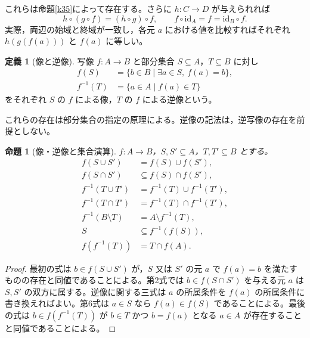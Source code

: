 \documentclass[a5paper,10pt,dvipdfmx]{jsarticle}
\theoremstyle{definition}
\newtheorem{defn}[ruledef]{定義}
\theoremstyle{plain}
\newtheorem{prop}[ruledef]{命題}
\newcommand{\id}{\mathrm{id}}
\begin{document}
これらは命題\ref{k35}によって存在する。さらに $h:C\to D$ が与えられれば
\[
 h\circ(g\circ f)=(h\circ g)\circ f,
 \qquad f\circ\id_A=f=\id_B\circ f.
\]
実際，両辺の始域と終域が一致し，各元 $a$ における値を比較すればそれぞれ $h(g(f(a)))$ と $f(a)$ に等しい。
\begin{defn}[像と逆像]\label{k37}
写像 $f:A\to B$ と部分集合 $S\subseteq A$，$T\subseteq B$ に対し
\begin{align*}
 f(S)&=\{b\in B\mid\exists a\in S,\ f(a)=b\},\\
 f^{-1}(T)&=\{a\in A\mid f(a)\in T\}
\end{align*}
をそれぞれ $S$ の $f$ による像，$T$ の $f$ による逆像という。
\end{defn}
これらの存在は部分集合の指定の原理による。逆像の記法は，逆写像の存在を前提としない。
\begin{prop}[像・逆像と集合演算]\label{k38}
$f:A\to B$，$S,S'\subseteq A$，$T,T'\subseteq B$ とする。
\begin{align*}
 f(S\cup S')&=f(S)\cup f(S'),\\
 f(S\cap S')&\subseteq f(S)\cap f(S'),\\
 f^{-1}(T\cup T')&=f^{-1}(T)\cup f^{-1}(T'),\\
 f^{-1}(T\cap T')&=f^{-1}(T)\cap f^{-1}(T'),\\
 f^{-1}(B\setminus T)&=A\setminus f^{-1}(T),\\
 S&\subseteq f^{-1}(f(S)),\\
 f(f^{-1}(T))&=T\cap f(A).
\end{align*}
\end{prop}
\begin{proof}
最初の式は $b\in f(S\cup S')$ が，$S$ 又は $S'$ の元 $a$ で $f(a)=b$ を満たすものの存在と同値であることによる。第2式では $b\in f(S\cap S')$ を与える元 $a$ は $S,S'$ の双方に属する。逆像に関する三式は $a$ の所属条件を $f(a)$ の所属条件に書き換えればよい。第6式は $a\in S$ なら $f(a)\in f(S)$ であることによる。最後の式は $b\in f(f^{-1}(T))$ が $b\in T$ かつ $b=f(a)$ となる $a\in A$ が存在することと同値であることによる。
\end{proof}
\end{document}
